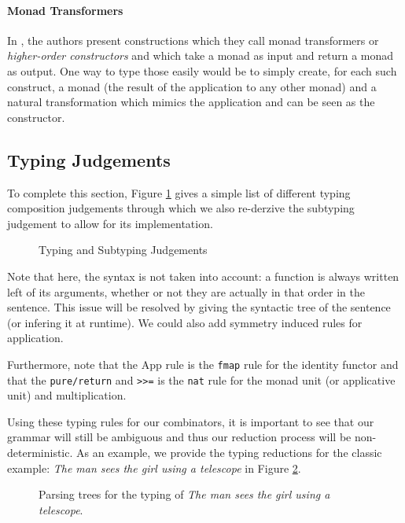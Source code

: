 \paragraph{Monad Transformers}
In \cite{bumfordEffectdrivenInterpretationFunctors2025}, the authors present
constructions which they call monad transformers or \emph{higher-order
	constructors} and which take a monad as input and return a monad as output.
One way to type those easily would be to simply create, for each such
construct, a monad (the result of the application to any other monad) and a
natural transformation which mimics the application and can be seen as the
constructor.

\subsection{Typing Judgements}\label{subsec:judgements}
To complete this section, Figure \ref{tab:judgements} gives a simple list of different typing composition judgements through which we also re-derzive the subtyping judgement to allow for its implementation.
\begin{figure}
	\caption{Typing and Subtyping Judgements}
	\label{tab:judgements}
\end{figure}
Note that here, the syntax is not taken into account: a function is always written left of its arguments, whether or not they are actually in that order in the sentence.
This issue will be resolved by giving the syntactic tree of the sentence (or infering it at runtime).
We could also add symmetry induced rules for application.

Furthermore, note that the App rule is the \texttt{fmap} rule for the identity functor and that the \texttt{pure/return} and \texttt{>>=} is the \texttt{nat} rule for the monad unit (or applicative unit) and multiplication.

\medskip

Using these typing rules for our combinators, it is important to see that our grammar will still be ambiguous and thus our reduction process will be non-deterministic.
As an example, we provide the typing reductions for the classic example: \textsl{The man sees the girl using a telescope} in Figure \ref{fig:ud}.

\begin{figure}
	\centering
	\caption{Parsing trees for the typing of \textsl{The man sees the girl using a telescope}.}
	\label{fig:ud}
\end{figure}

